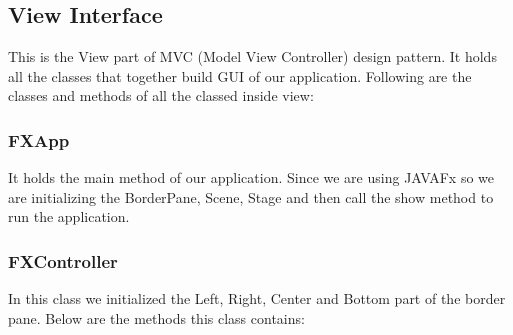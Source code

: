 \documentclass{scrreprt}
\begin{document}
\subsection{View Interface}

This is the View part of MVC (Model View Controller) design pattern. It holds all the classes that together build GUI of our application. Following are the classes and methods of all the classed inside view:

\subsubsection{FXApp}

It holds the main method of our application. Since we are using JAVAFx so we are initializing the BorderPane, Scene, Stage and then call the show method to run the application.

\subsubsection{FXController}

In this class we initialized the Left, Right, Center and Bottom part of the border pane. Below are the methods this class contains:
\end{document}
